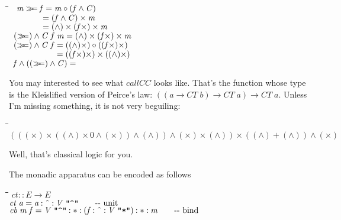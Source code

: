 \documentclass{article}
\newlength{\lwidth}\setlength{\lwidth}{4.5cm}
\newlength{\cwidth}\setlength{\cwidth}{8mm} %
\newcommand{\Conid}[1]{\mathit{#1}}
\newcommand{\Varid}[1]{\mathit{#1}}
\newcommand{\bind}{\mathbin{>\!\!\!>\mkern-6.7mu=}}
\begin{document}
\begin{tabbing}
\qquad\=\hspace{\lwidth}\=\hspace{\cwidth}\=\+\kill
${\hskip0.50em\relax\Varid{m}\bind \Varid{f}\mathrel{=}\Varid{m}\mathbin{\circ}(\Varid{f}\wedge\Conid{C})}$\\
${\hskip0.50em\relax\phantom{\Varid{m}\bind \Varid{f}\mbox{}}\mathrel{=}(\Varid{f}\wedge\Conid{C})\times\Varid{m}}$\\
${\hskip0.50em\relax\phantom{\Varid{m}\bind \Varid{f}\mbox{}}\mathrel{=}(\wedge)\times(\Varid{f}\times)\times\Varid{m}}$\\
${\hskip0.50em\relax(\bind )\wedge\Conid{C}\;\Varid{f}\;\Varid{m}\mathrel{=}(\wedge)\times(\Varid{f}\times)\times\Varid{m}}$\\
${\hskip0.50em\relax(\bind )\wedge\Conid{C}\;\Varid{f}\mathrel{=}((\wedge)\times)\mathbin{\circ}((\Varid{f}\times)\times)}$\\
${\hskip0.50em\relax\phantom{(\bind )\wedge\Conid{C}\;\Varid{f}\mbox{}}\mathrel{=}((\Varid{f}\times)\times)\times((\wedge)\times)}$\\
${\hskip0.50em\relax\Varid{f}\wedge((\bind )\wedge\Conid{C})\mathrel{=}}$
\end{tabbing}
You may interested to see what \ensuremath{\Varid{callCC}} looks like.  That's
the function whose type is the Kleislified version of 
Peirce's law:  \ensuremath{((\Varid{a}\to \Conid{CT}\;\Varid{b})\to \Conid{CT}\;\Varid{a})\to \Conid{CT}\;\Varid{a}}. Unless I'm
missing something, it is not very beguiling:
\begin{tabbing}
\qquad\=\hspace{\lwidth}\=\hspace{\cwidth}\=\+\kill
${(((\times)\times((\wedge)\times\mathrm{0}\wedge(\times))\wedge(\wedge))\wedge(\times)\times(\wedge))\times((\wedge)\mathbin{+}(\wedge))\wedge(\times)}$
\end{tabbing}Well, that's classical logic for you.

The monadic apparatus can be encoded as follows
\begin{tabbing}
\qquad\=\hspace{\lwidth}\=\hspace{\cwidth}\=\+\kill
${\Varid{ct}\mathbin{::}\Conid{E}\to \Conid{E}}$\\
${\Varid{ct}\;\Varid{a}\mathrel{=}\Varid{a}\mathbin{:\char94 :}\Conid{V}\;\text{\ttfamily \char34 \char94 \char34}\mbox{\qquad-{}-  unit}}$\\
${\Varid{cb}\;\Varid{m}\;\Varid{f}\mathrel{=}\Conid{V}\;\text{\ttfamily \char34 \char94 \char34}\mathbin{:*:}(\Varid{f}\mathbin{:\char94 :}\Conid{V}\;\text{\ttfamily \char34 *\char34})\mathbin{:*:}\Varid{m}\mbox{\qquad-{}-  bind}}$
\end{tabbing}
\end{document}
